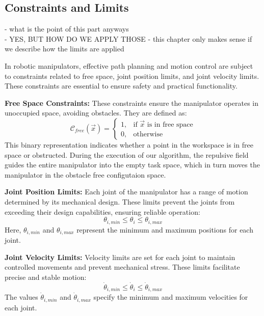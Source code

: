 \documentclass[]{article}
\begin{document}
\subsection{Constraints and Limits}

\alert{
	- what is the point of this part anyways \\
	- YES, BUT HOW DO WE APPLY THOSE - this chapter only makes sense if we describe how the limits are applied \\
}


In robotic manipulators, effective path planning and motion control are subject to constraints related to free space, joint position limits, and joint velocity limits. These constraints are essential to ensure safety and practical functionality.

\textbf{Free Space Constraints:} These constraints ensure the manipulator operates in unoccupied space, avoiding obstacles. They are defined as:
\begin{equation}
	\mathcal{C}_{free}(\vec{x}) = \begin{cases} 
		1, & \text{if }\vec{x} \text{ is in free space} \\
		0, & \text{otherwise}
	\end{cases}
	\label{eq:free_space_constraint}
\end{equation}
This binary representation indicates whether a point in the workspace is in free space or obstructed. During the execution of our algorithm, the repulsive field guides the entire manipulator into the empty task space, which in turn moves the manipulator in the obstacle free configutaion space.

\textbf{Joint Position Limits:} Each joint of the manipulator has a range of motion determined by its mechanical design. These limits prevent the joints from exceeding their design capabilities, ensuring reliable operation:
\begin{equation}
	\theta_{i, min} \leq \theta_i \leq \theta_{i, max}
	\label{eq:joint_position_constraint}
\end{equation}
Here, \(\theta_{i, min}\) and \(\theta_{i, max}\) represent the minimum and maximum positions for each joint.

\textbf{Joint Velocity Limits:} Velocity limits are set for each joint to maintain controlled movements and prevent mechanical stress. These limits facilitate precise and stable motion:
\begin{equation}
	\dot{\theta}_{i, min} \leq \dot{\theta}_i \leq \dot{\theta}_{i, max}
	\label{eq:joint_velocity_constraint}
\end{equation}
The values \(\dot{\theta}_{i, min}\) and \(\dot{\theta}_{i, max}\) specify the minimum and maximum velocities for each joint.
\end{document}
